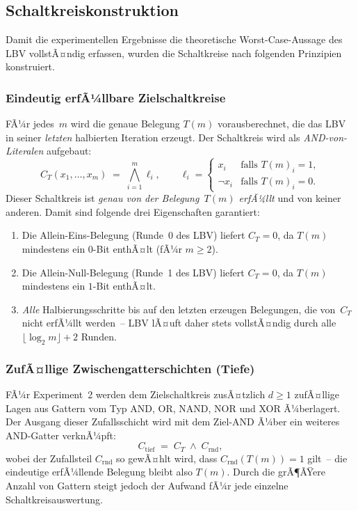 ﻿\documentclass[a4paper,12pt]{article}
\theoremstyle{definition}
\begin{document}
\subsection{Schaltkreiskonstruktion}
\label{subsec:schaltkreis-konstruktion}

Damit die experimentellen Ergebnisse die theoretische Worst-Case-Aussage des LBV
vollstÃ¤ndig erfassen, wurden die Schaltkreise nach folgenden Prinzipien konstruiert.

\subsubsection{Eindeutig erfÃ¼llbare Zielschaltkreise}

FÃ¼r jedes~$m$ wird die genaue Belegung $T(m)$ vorausberechnet, die das LBV in seiner
\emph{letzten} halbierten Iteration erzeugt.  Der Schaltkreis wird als
\emph{AND-von-Literalen} aufgebaut:
\[
  C_{T}(x_1,\ldots,x_m)
  \;=\;
  \bigwedge_{i=1}^{m} \ell_i,
  \qquad
  \ell_i =
  \begin{cases}
    x_i       & \text{falls } T(m)_i = 1, \\
    \neg x_i  & \text{falls } T(m)_i = 0.
  \end{cases}
\]
Dieser Schaltkreis ist \emph{genau von der Belegung~$T(m)$ erfÃ¼llt} und von keiner anderen.
Damit sind folgende drei Eigenschaften garantiert:

\begin{enumerate}
  \item Die Allein-Eins-Belegung (Runde~0 des LBV) liefert $C_T = 0$, da $T(m)$
    mindestens ein $0$-Bit enthÃ¤lt (fÃ¼r $m \geq 2$).
  \item Die Allein-Null-Belegung (Runde~1 des LBV) liefert $C_T = 0$, da $T(m)$
    mindestens ein $1$-Bit enthÃ¤lt.
  \item \emph{Alle} Halbierungsschritte bis auf den letzten erzeugen Belegungen, die
    von~$C_T$ nicht erfÃ¼llt werden~-- LBV lÃ¤uft daher stets vollstÃ¤ndig durch alle
    $\lfloor \log_2 m \rfloor + 2$ Runden.
\end{enumerate}

\subsubsection{ZufÃ¤llige Zwischengatterschichten (Tiefe)}

FÃ¼r Experiment~2 werden dem Zielschaltkreis zusÃ¤tzlich $d \geq 1$ zufÃ¤llige Lagen aus
Gattern vom Typ AND, OR, NAND, NOR und XOR Ã¼berlagert.  Der Ausgang dieser Zufallsschicht
wird mit dem Ziel-AND Ã¼ber ein weiteres AND-Gatter verknÃ¼pft:
\[
  C_{\mathrm{tief}}
  \;=\;
  C_T \;\wedge\; C_{\mathrm{rnd}},
\]
wobei der Zufallsteil $C_{\mathrm{rnd}}$ so gewÃ¤hlt wird, dass $C_{\mathrm{rnd}}(T(m)) = 1$
gilt~-- die eindeutige erfÃ¼llende Belegung bleibt also $T(m)$.  Durch die grÃ¶ÃŸere Anzahl
von Gattern steigt jedoch der Aufwand fÃ¼r jede einzelne Schaltkreisauswertung.
\end{document}

